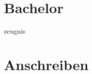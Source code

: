 \documentclass[11pt,a4paper]{moderncv}
\begin{document}
\newpage
\chapter{Bachelor}{zeugnis}
\vspace*{1cm}
\begin{center}
\end{center}

\newpage
\chapter{Anschreiben}{}

\vspace*{1cm}
\begin{center}
\end{center}

\vspace*{1cm}
\begin{center}
\end{center}

\end{document}
